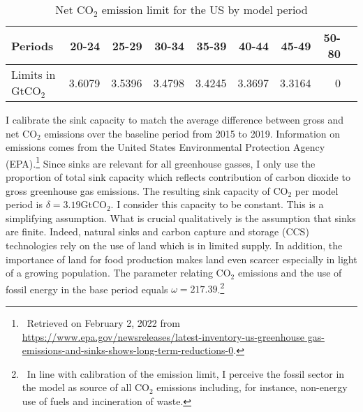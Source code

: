  \begin{table}[hh!!!!!]
	\begin{center}
		\captionsetup{width=0.9\textwidth}
		\caption{Net CO$_2$ emission limit for the US by model period}
		\label{tab:emlimit}
		\begin{tabular}{l|rrrrrrrr}
			\hline 
			\hline
			Periods&20-24&25-29&30-34&35-39&40-44&45-49&50-80\\
			\hline	
			Limits in GtCO$_2$&3.6079&3.5396&3.4798&3.4245&3.3697&3.3164&0\\
			\hline \hline
		 			
	\end{tabular}
\end{center}
\end{table}	
 

 
 I calibrate the sink capacity to match the average difference between gross and net CO$_2$ emissions over the baseline period from 2015 to 2019.  Information on emissions comes from the United States Environmental Protection Agency (EPA).\footnote{\ Retrieved on February 2, 2022 from  \url{https://www.epa.gov/newsreleases/latest-inventory-us-greenhouse gas-emissions-and-sinks-shows-long-term-reductions-0}. } Since sinks are relevant for all greenhouse gasses, I only use the proportion of total sink capacity which reflects contribution of carbon dioxide to gross greenhouse gas emissions. The resulting sink capacity of CO$_2$ per model period is $\delta=3.19$GtCO$_2$.  I consider this capacity to be constant. This is a simplifying assumption. What is crucial qualitatively is the assumption that sinks are finite. Indeed, natural sinks and carbon capture and storage (CCS) technologies rely on the use of land \citep{VanVuuren2018AlternativeTechnologies} which is in limited supply. In addition, the importance of land for food production makes land even scarcer especially in light of a growing population.
 The parameter relating CO$_2$ emissions and the use of fossil energy in the base period equals $\omega=217.39$.\footnote{\  In line with calibration of the emission limit, I perceive the fossil sector in the model as source of all CO$_2$ emissions including, for instance, non-energy use of fuels and incineration of waste.}  
 
